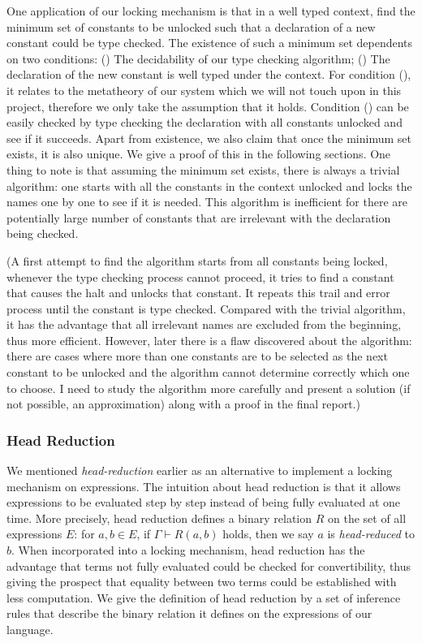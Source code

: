 \documentclass{article}
\theoremstyle{remark}
\begin{document}
One application of our locking mechanism is that in a well typed context, find the minimum set of constants to be unlocked such that a declaration of a new constant could be type checked. The existence of such a minimum set dependents on two conditions: () The decidability of our type checking algorithm; () The declaration of the new constant is well typed under the context. For condition (), it relates to the metatheory of our system which we will not touch upon in this project, therefore we only take the assumption that it holds. Condition () can be easily checked by type checking the declaration with all constants unlocked and see if it succeeds. Apart from existence, we also claim that once the minimum set exists, it is also unique. We give a proof of this in the following sections. One thing to note is that assuming the minimum set exists, there is always a trivial algorithm: one starts with all the constants in the context unlocked and locks the names one by one to see if it is needed. This algorithm is inefficient for there are potentially large number of constants that are irrelevant with the declaration being checked.

(A first attempt to find the algorithm starts from all constants being locked, whenever the type checking process cannot proceed, it tries to find a constant that causes the halt and unlocks that constant. It repeats this trail and error process until the constant is type checked. Compared with the trivial algorithm, it has the advantage that all irrelevant names are excluded from the beginning, thus more efficient. However, later there is a flaw discovered about the algorithm: there are cases where more than one constants are to be selected as the next constant to be unlocked and the algorithm cannot determine correctly which one to choose. I need to study the algorithm more carefully and present a solution (if not possible, an approximation) along with a proof in the final report.)

\subsubsection{Head Reduction} \label{sec:head-red}
We mentioned \emph{head-reduction} earlier as an alternative to implement a locking mechanism on expressions. The intuition about head reduction is that it allows expressions to be evaluated step by step instead of being fully evaluated at one time. More precisely, head reduction defines a binary relation $R$ on the set of all expressions $E$: for $a, b \in E$, if $\Gamma \vdash R(a, b)$ holds, then we say $a$ is \emph{head-reduced} to $b$. When incorporated into a locking mechanism, head reduction has the advantage that terms not fully evaluated could be checked for convertibility, thus giving the prospect that equality between two terms could be established with less computation. We give the definition of head reduction by a set of inference rules that describe the binary relation it defines on the expressions of our language. 
\end{document}
